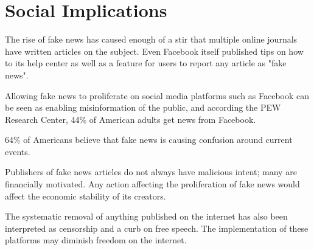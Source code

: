 
\section{Social Implications}


The rise of fake news has caused enough of a stir that multiple online journals have written articles on the subject. \cite{tc_what_is_fake_news,telegraph_fake_news,npr_fake_news} Even Facebook itself published tips on how to its help center \cite{fb_spot_fake_news} as well as a feature for users to report any article as "fake news". \cite{tc_fb_down_ranks_fake_news}

Allowing fake news to proliferate on social media platforms such as Facebook can be seen as enabling misinformation of the public, \cite{tc_facebook_responsibility} and according the PEW Research Center, 44\% of American adults get news from Facebook. \cite{pew_social_media_news} 

64\% of Americans believe that fake news is causing confusion around current events. \cite{pew_fn_confusion}

Publishers of fake news articles do not always have malicious intent; \cite{cbs_fake_news} many are financially motivated. \cite{fb_addressing_hoaxes} Any action affecting the proliferation of fake news would affect the economic stability of its creators.


The systematic removal of anything published on the internet has also been interpreted as censorship and a curb on free speech. \cite{eff_cali_bill_distrastrous} The implementation of these platforms may diminish freedom on the internet.

